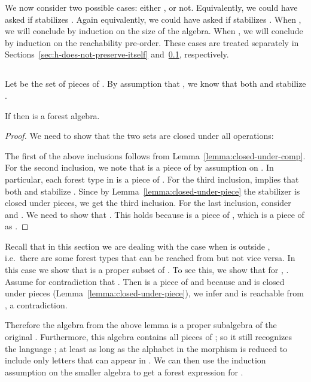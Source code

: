 \documentclass{LMCS}
\begin{document}
We now consider two possible cases: either , or not. Equivalently,
we could have asked if  stabilizes . Again equivalently, we could
have asked if  stabilizes . When , we will conclude by
induction on the size of the algebra. When , we will conclude
by induction on the reachability pre-order. These cases are treated separately
in Sections~\ref{sec:h-does-not-preserve-itself}
and~\ref{sec:h-preserves-itself}, respectively.

\subsection{\texorpdfstring{}{h+h sim h}}
\label{sec:h-preserves-itself}
Let  be the set of pieces of . By assumption that ,
we know that both  and  stabilize . 
\begin{lem}\label{lem:sub-forest-algebra}
  If  then  is a forest
  algebra.
\end{lem}
\begin{proof}
    We need to show that the two sets are closed under all operations:

  The first of the above inclusions follows from
  Lemma~\ref{lemma:closed-under-comp}. For the second inclusion, we
  note that  is a piece of  by assumption on . In
  particular, each forest type in  is a piece of . For the
  third inclusion,  implies that both  and
   stabilize . Since by
  Lemma~\ref{lemma:closed-under-piece} the stabilizer is closed under
  pieces, we get the third inclusion. For the last inclusion, consider
   and . We need to show that . This holds because  is a piece of , which is a piece of
   as .
\end{proof}


Recall that in this section we are dealing with the case when  is
outside , i.e.~there are some forest types that can be
reached from  but not vice versa. In this case we show that  is a proper
subset of . To see this, we show that for , . Assume for contradiction that . Then  is a
piece of  and because  and  is closed
under pieces (Lemma~\ref{lemma:closed-under-piece}), we infer  and  is reachable from , a contradiction.

Therefore the algebra from the above lemma is a
proper subalgebra of the original .  Furthermore, this algebra
contains all pieces of ; so it still recognizes the language ;
at least as long as the alphabet in the morphism is reduced to include
only letters that can appear in .  We can then use the induction
assumption on the smaller algebra to get a  forest
expression for .
\end{document}
